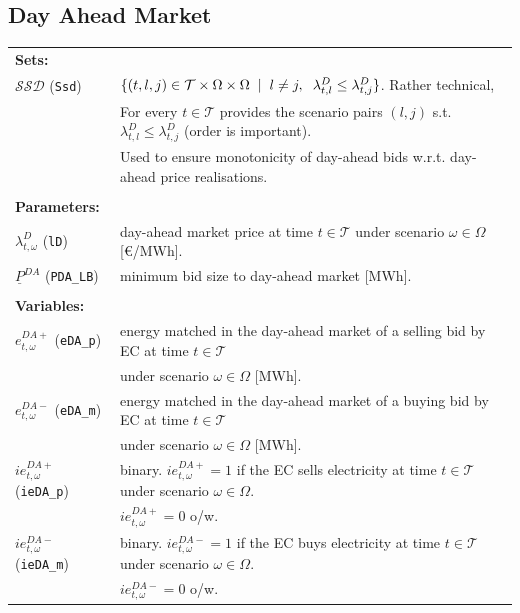 \documentclass{article}
\begin{document}
\subsection{Day Ahead Market}

\begin{tabularx}{\textwidth}{l l}
    \textbf{Sets:} \\
    	$\mathcal{SSD}$ (\verb|Ssd|) & $\{(t, l, j) \in \mathcal{T} \times \Omega \times \Omega \hspace{2mm} | \hspace{2mm} l \neq j, \hspace{2mm} \lambda^D_{t, l} \leq \lambda^D_{t, j} \}$. Rather technical, \\
	& For every $t \in \mathcal{T}$ provides the scenario pairs $(l, j)$ s.t. $\lambda^D_{t, l} \leq \lambda^D_{t, j}$ (order is important). \\	
	& Used to ensure monotonicity of day-ahead bids w.r.t. day-ahead price realisations. \\

	\\
    \textbf{Parameters:} \\
	$\lambda^{D}_{t, \omega}$ (\verb|lD|) & day-ahead market price at time $t \in \mathcal{T}$ under scenario $\omega \in \Omega$ [\euro/MWh]. \\
	$\underline{P}^{DA}$ (\verb|PDA_LB|) & minimum bid size to day-ahead market [MWh]. \\   
    \\
       
    \textbf{Variables:} \\
	$e^{DA+}_{t, \omega}$ (\verb|eDA_p|) & energy matched in the day-ahead market of a selling bid by EC at time $t \in \mathcal{T}$ \\
	& under scenario $\omega \in \Omega$ [MWh]. \\
	$e^{DA-}_{t, \omega}$ (\verb|eDA_m|) & energy matched in the day-ahead market of a buying bid by EC at time $t \in \mathcal{T}$ \\
	& under scenario $\omega \in \Omega$ [MWh]. \\
	$ie^{DA+}_{t, \omega}$ (\verb|ieDA_p|) & binary. $ie^{DA+}_{t, \omega} = 1$ if the EC sells electricity at time $t \in \mathcal{T}$ under scenario $\omega \in \Omega$. \\
	& $ie^{DA+}_{t, \omega} = 0$ o/w. \\
	$ie^{DA-}_{t, \omega}$ (\verb|ieDA_m|) & binary. $ie^{DA-}_{t, \omega} = 1$ if the EC buys electricity at time $t \in \mathcal{T}$ under scenario $\omega \in \Omega$. \\
	& $ie^{DA-}_{t, \omega} = 0$ o/w.
    \\
\end{tabularx}
\end{document}
